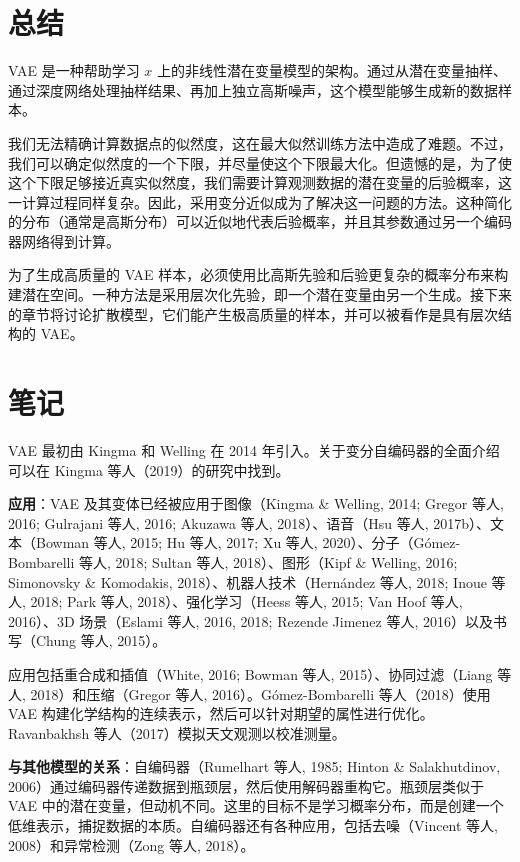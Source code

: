 \section{总结}
VAE 是一种帮助学习 \(x\) 上的非线性潜在变量模型的架构。通过从潜在变量抽样、通过深度网络处理抽样结果、再加上独立高斯噪声，这个模型能够生成新的数据样本。

我们无法精确计算数据点的似然度，这在最大似然训练方法中造成了难题。不过，我们可以确定似然度的一个下限，并尽量使这个下限最大化。但遗憾的是，为了使这个下限足够接近真实似然度，我们需要计算观测数据的潜在变量的后验概率，这一计算过程同样复杂。因此，采用变分近似成为了解决这一问题的方法。这种简化的分布（通常是高斯分布）可以近似地代表后验概率，并且其参数通过另一个编码器网络得到计算。

为了生成高质量的 VAE 样本，必须使用比高斯先验和后验更复杂的概率分布来构建潜在空间。一种方法是采用层次化先验，即一个潜在变量由另一个生成。接下来的章节将讨论扩散模型，它们能产生极高质量的样本，并可以被看作是具有层次结构的 VAE。


\section{笔记}
VAE 最初由 Kingma 和 Welling 在 2014 年引入。关于变分自编码器的全面介绍可以在 Kingma 等人（2019）的研究中找到。

\textbf{应用}：VAE 及其变体已经被应用于图像（Kingma \& Welling, 2014; Gregor 等人, 2016; Gulrajani 等人, 2016; Akuzawa 等人, 2018）、语音（Hsu 等人, 2017b）、文本（Bowman 等人, 2015; Hu 等人, 2017; Xu 等人, 2020）、分子（Gómez-Bombarelli 等人, 2018; Sultan 等人, 2018）、图形（Kipf \& Welling, 2016; Simonovsky \& Komodakis, 2018）、机器人技术（Hernández 等人, 2018; Inoue 等人, 2018; Park 等人, 2018）、强化学习（Heess 等人, 2015; Van Hoof 等人, 2016）、3D 场景（Eslami 等人, 2016, 2018; Rezende Jimenez 等人, 2016）以及书写（Chung 等人, 2015）。

应用包括重合成和插值（White, 2016; Bowman 等人, 2015）、协同过滤（Liang 等人, 2018）和压缩（Gregor 等人, 2016）。Gómez-Bombarelli 等人（2018）使用 VAE 构建化学结构的连续表示，然后可以针对期望的属性进行优化。Ravanbakhsh 等人（2017）模拟天文观测以校准测量。

\textbf{与其他模型的关系}：自编码器（Rumelhart 等人, 1985; Hinton \& Salakhutdinov, 2006）通过编码器传递数据到瓶颈层，然后使用解码器重构它。瓶颈层类似于 VAE 中的潜在变量，但动机不同。这里的目标不是学习概率分布，而是创建一个低维表示，捕捉数据的本质。自编码器还有各种应用，包括去噪（Vincent 等人, 2008）和异常检测（Zong 等人, 2018）。

